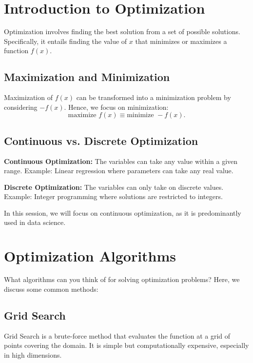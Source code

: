 \documentclass[]{article}
\title{}
\author{}
\begin{document}
	
	\maketitle
	
	\begin{abstract}
		
	\end{abstract}
	
	\section*{Introduction to Optimization}
	Optimization involves finding the best solution from a set of possible solutions. Specifically, it entails finding the value of $x$ that minimizes or maximizes a function $f(x)$.
	
	\subsection*{Maximization and Minimization}
	Maximization of $f(x)$ can be transformed into a minimization problem by considering $-f(x)$. Hence, we focus on minimization:
	\[
	\text{maximize } f(x) \equiv \text{minimize } -f(x).
	\]
	
	\subsection*{Continuous vs. Discrete Optimization}
	\textbf{Continuous Optimization:} The variables can take any value within a given range. Example: Linear regression where parameters can take any real value.
	
	\textbf{Discrete Optimization:} The variables can only take on discrete values. Example: Integer programming where solutions are restricted to integers.
	
	In this session, we will focus on continuous optimization, as it is predominantly used in data science.
	
	\section*{Optimization Algorithms}
	What algorithms can you think of for solving optimization problems? Here, we discuss some common methods:
	
	\subsection*{Grid Search}
	Grid Search is a brute-force method that evaluates the function at a grid of points covering the domain. It is simple but computationally expensive, especially in high dimensions.
	
\end{document}
